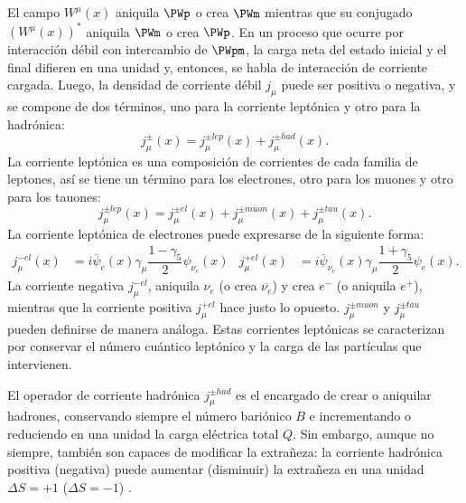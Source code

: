El campo $W^{\mu}(x)$ aniquila $\PWp$ o crea $\PWm$ mientras que su conjugado $\left(W^{\mu}(x)\right)^\ast$ aniquila $\PWm$ o crea $\PWp$. En un proceso que ocurre por interacción débil con intercambio de $\PWpm$, la carga neta del estado inicial y el final difieren en una unidad y, entonces, se habla de interacción de corriente cargada. Luego, la densidad de corriente débil $j_{\mu}$ puede ser positiva o negativa, y se compone de dos términos, uno para la corriente leptónica y otro para la hadrónica:
\begin{equation}
j_{\mu} ^{\pm }\left( x\right) =j_{\mu} ^{\pm lep}\left( x\right) +j_{\mu} ^{\pm had}\left( x\right) . \label{eq:weak_current_hadylep}
\end{equation}
La corriente leptónica es una composición de corrientes de cada familia de leptones, así se tiene un término para los electrones, otro para los muones y otro para los tauones:
\begin{equation}
j_{\mu }^{\pm lep}\left( x\right) =j_{\mu }^{\pm el}\left( x\right) +j_{\mu }^{\pm muon}\left( x\right) +j_{\mu} ^{\pm tau}\left( x\right) . \label{eq:leptonic_weak_current}
\end{equation}
La corriente leptónica de electrones puede expresarse de la siguiente forma:
\begin{align}
j_{\mu }^{-el}\left(x\right)&=i\overline{\psi}_{e}\left( x\right) \gamma _{\mu }\dfrac{1-\gamma_{5}}{2}\psi_{{ \nu}_{e}}\left( x\right) & j_{\mu}^{+el}\left(x\right)&= i\overline{\psi}_{{\nu}_{e}}\left(x\right)\gamma _{\mu}\dfrac{1+\gamma_{5}}{2}\psi_{e}\left( x\right) . \label{eq:electric_weak_current}
\end{align}
La corriente negativa $j_{\mu }^{-el}$, aniquila $\nu_e$ (o crea $\overline{\nu_e}$) y crea $e^-$ (o aniquila $e^+$), mientras que la corriente positiva $j_{\mu }^{+el}$ hace justo lo opuesto. $j_{\mu }^{\pm muon}$ y $j_{\mu }^{\pm tau}$ pueden definirse de manera análoga. Estas corrientes leptónicas se caracterizan por conservar el número cuántico leptónico y la carga de las partículas que intervienen. 

El operador de corriente hadrónica $j_{\mu} ^{\pm had}$ es el encargado de crear o aniquilar hadrones, conservando siempre el número bariónico $B$ e incrementando o reduciendo en una unidad la carga eléctrica total $Q$. Sin embargo, aunque no siempre, también son capaces de modificar la extrañeza: la corriente hadrónica positiva (negativa) puede aumentar (disminuir) la extrañeza en una unidad $\Delta S = +1$ ($\Delta S = -1$) \cite{notas2020}.

